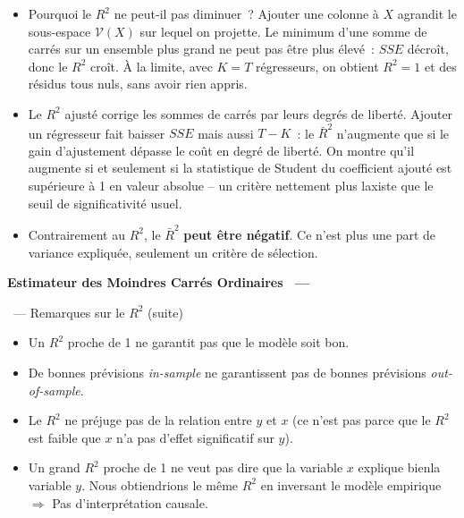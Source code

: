 \documentclass[10pt,a4paper]{article}
\makeatletter
\theoremstyle{definition}
\renewcommand{\newline}{\unskip\par\vspace{1.5pt}}
\newenvironment{frame}[1][]{\par}{\par}
\newcommand{\frameheadrule}{%
  \par\nobreak\vspace{1pt}{\color{ctitle}\hrule height 0.6pt}\nobreak\vspace{4pt}}
\newcommand{\frametitle}[1]{%
  \par\addvspace{8pt plus 2pt}\needspace{6\baselineskip}%
  \noindent\begingroup\color{ctitle}\sffamily\bfseries\large #1\endgroup
  \@ifnextchar\framesubtitle{}{\frameheadrule}}
\newcommand{\framesubtitle}[1]{%
  \begingroup\color{ctitle}\sffamily\normalsize\ --- #1\endgroup\frameheadrule}
\makeatother
\begin{document}
\begin{notes}

  \begin{itemize}

  \item Pourquoi le $R^2$ ne peut-il pas diminuer~? Ajouter une colonne à $X$ agrandit
    le sous-espace $\mathcal V(X)$ sur lequel on projette. Le minimum d'une somme de
    carrés sur un ensemble plus grand ne peut pas être plus élevé~: $SSE$ décroît, donc
    le $R^2$ croît. À la limite, avec $K=T$ régresseurs, on obtient $R^2=1$ et des
    résidus tous nuls, sans avoir rien appris.\newline

  \item Le $R^2$ ajusté corrige les sommes de carrés par leurs degrés de liberté.
    Ajouter un régresseur fait baisser $SSE$ mais aussi $T-K$~: le $\bar R^2$ n'augmente
    que si le gain d'ajustement dépasse le coût en degré de liberté. On montre qu'il
    augmente si et seulement si la statistique de Student du coefficient ajouté est
    supérieure à 1 en valeur absolue -- un critère nettement plus laxiste que le seuil
    de significativité usuel.\newline

  \item Contrairement au $R^2$, le $\bar R^2$ \textbf{peut être négatif}. Ce n'est plus
    une part de variance expliquée, seulement un critère de sélection.

  \end{itemize}

\end{notes}


\begin{frame}
  \frametitle{Estimateur des Moindres Carrés Ordinaires}
  \framesubtitle {Remarques sur le  $R^2$ (suite)}


  \begin{itemize}

  \item Un $R^2$ proche de 1 ne garantit pas que le modèle soit \guillemotleft bon\guillemotright.\newline

  \item De bonnes prévisions \textit{in-sample} ne garantissent pas de bonnes prévisions \textit{out-of-sample}.\newline

  \item Le $R^2$ ne préjuge pas de la relation entre $y$ et $x$ (ce n'est pas parce que le $R^2$ est faible que $x$ n'a pas d'effet significatif sur $y$).\newline

  \item Un grand $R^2$ proche de 1 ne veut pas dire que la variable $x$ explique  \guillemotleft bien\guillemotright  la variable $y$. Nous obtiendrions le même  $R^2$ en inversant le modèle empirique $\Rightarrow$ Pas d'interprétation causale.

  \end{itemize}

\end{frame}
\end{document}
